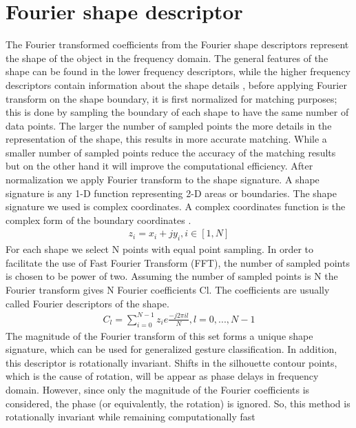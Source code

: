 \section{Fourier shape descriptor } \label{FDT}
The Fourier transformed coefficients from the Fourier
shape descriptors represent the shape of the object in
the frequency domain. The general features of the shape can
be found in the lower frequency descriptors, while the higher
frequency descriptors contain information about the shape
details \cite{20}, before applying Fourier transform on the shape boundary, it is first normalized for matching purposes; this is done by sampling the boundary of each shape to have the same number of data points. The larger the number of sampled points the more details in the representation of the shape,  this results in more accurate matching. While a smaller number of sampled points reduce the accuracy of the matching results but on the other hand it will improve the computational efficiency.
After normalization we  apply Fourier transform to the
shape signature. A shape signature is any 1-D function
representing 2-D areas or boundaries. The shape signature we
used is complex coordinates. A complex coordinates function
is the complex form of the boundary coordinates \cite{20}.
\begin{gather}
    z_{i} = x_{i}+j y_{i} , i\in [1,N]
\end{gather}
For each shape we select N points with equal point
sampling. In order to facilitate the use of Fast Fourier
Transform (FFT), the number of sampled points is chosen to
be power of two. Assuming the number of sampled points is
N the Fourier transform gives N Fourier coefficients Cl. The
coefficients are usually called Fourier descriptors of the shape. 
\begin{gather}
C_{l}= \sum_{i=0}^{N-1} z_{i}e{\frac{-j 2\pi il}{N}} , l = 0,...,N-1
\end{gather}
The magnitude of the Fourier
transform of this set forms a unique shape signature, which can be used for generalized
gesture classification.
In addition, this descriptor is rotationally invariant. Shifts in the silhouette contour
points, which is the cause of rotation, will be appear as phase delays in frequency
domain. However, since only the magnitude of the Fourier coefficients is considered,
the phase (or equivalently, the rotation) is ignored. So, this method is rotationally
invariant while remaining computationally fast\\


